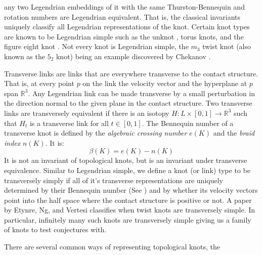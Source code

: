 \documentclass{article}
\theoremstyle{plain}
\begin{document}
        any two Legendrian embeddings of it with the same Thurston-Bennequin
        and rotation numbers are Legendrian equivalent. That is, the classical
        invariants uniquely classify all Legendrian representations of the knot.
        Certain knot types are known to be Legendrian simple such as the unknot
        \cite{EliashbergFraserClassificationTopTrivialLegKnots}, torus knots,
        and the figure eight knot \cite{EtnyreHondaContactTopologyI}.
        Not every knot is Legendrian simple, the $m_{3}$ twist knot (also
        known as the $5_{2}$ knot) being an example discovered by Chekanov
        \cite{ChekanovDifAlgOfLegLinks}.
        \par\hfill\par
        Transverse links are links that are everywhere transverse to the
        contact structure. That is, at every point $p$ on the link the velocity
        vector and the hyperplane at $p$ span $\mathbb{R}^{3}$. Any Legendrian
        link can be made transverse by a small perturbation in the direction
        normal to the given plane in the contact structure.
        Two transverse links are transversely equivalent if there is an
        isotopy $H:L\times[0,1]\rightarrow\mathbb{R}^{3}$ such that $H_{t}$ is a
        transverse link for all $t\in[0,1]$. The Bennequin number of a
        transverse knot is defined by the \textit{algebraic crossing number}
        $e(K)$ and the \textit{braid index} $n(K)$. It is:
        \begin{equation}
            \beta(K)=e(K)-n(K)
        \end{equation}
        It is not an invariant of topological knots, but is an invariant under
        transverse equivalence. Similar to Legendrian simple, we define a knot
        (or link) type to be transversely simply if all of it's transverse
        representations are uniquely determined by their Bennequin number
        (See \cite{BirmanWrinkleTransversallySimpleKnots}) and by whether its
        velocity vectors point into the half space where the contact structure
        is positive or not. A paper by Etynre, Ng, and Vertesi
        \cite{EtnyreEtAlLegendrianAndTransverseTwistKnots}
        classifies when twist knots are transversely simple. In
        particular, infinitely many such knots are transversely simple giving
        us a family of knots to test conjectures with.
        \par\hfill\par
        There are several common ways of representing topological knots, the
\end{document}
